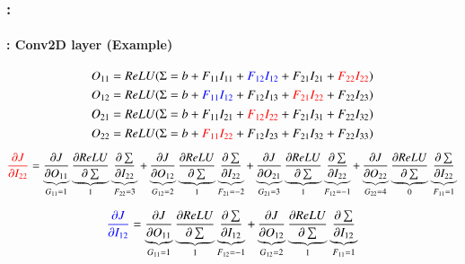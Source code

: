 \documentclass[xcolor=table]{beamer}
\begin{document}
\begin{frame}
	\frametitle{\insertshortsubtitle: \insertsection}
	\framesubtitle{\insertsubsection: Conv2D layer (Example)}
	
	
	\begin{center}
		\vskip-6pt
	\end{center}\vskip-16pt

	{\scriptsize 
		\[O_{11} = ReLU(\Sigma = b + F_{11} I_{11} + \textcolor{blue}{F_{12} I_{12}} + F_{21} I_{21} + \textcolor{red}{F_{22} I_{22}})  \]
		\[O_{12} = ReLU(\Sigma = b + \textcolor{blue}{F_{11} I_{12}} + F_{12} I_{13} + \textcolor{red}{F_{21} I_{22}} + F_{22} I_{23})  \]
		\[O_{21} = ReLU(\Sigma = b + F_{11} I_{21} + \textcolor{red}{F_{12} I_{22}} + F_{21} I_{31} + F_{22} I_{32})  \]
		\[O_{22} = ReLU(\Sigma = b + \textcolor{red}{F_{11} I_{22}} + F_{12} I_{23} + F_{21} I_{32} + F_{22} I_{33})  \]
	    	
	    \[\textcolor{red}{\frac{\partial J}{\partial I_{22}}} 
		= \underbrace{\frac{\partial J}{\partial O_{11}}}_{G_{11} = 1} 
		\underbrace{\frac{\partial ReLU}{\partial \sum}}_{1} 
		\underbrace{\frac{\partial \sum}{\partial I_{22}}}_{F_{22} = 3}
		+ \underbrace{\frac{\partial J}{\partial O_{12}}}_{G_{12} = 2} 
		\underbrace{\frac{\partial ReLU}{\partial \sum}}_{1} 
		\underbrace{\frac{\partial \sum}{\partial I_{22}}}_{F_{21} = -2}
		+ \underbrace{\frac{\partial J}{\partial O_{21}}}_{G_{21} = 3} 
		\underbrace{\frac{\partial ReLU}{\partial \sum}}_{1} 
		\underbrace{\frac{\partial \sum}{\partial I_{22}}}_{F_{12} = -1}
		+ \underbrace{\frac{\partial J}{\partial O_{22}}}_{G_{22} = 4} 
		\underbrace{\frac{\partial ReLU}{\partial \sum}}_{0} 
		\underbrace{\frac{\partial \sum}{\partial I_{22}}}_{F_{11} = 1}\]
		
		\[\textcolor{blue}{\frac{\partial J}{\partial I_{12}}} 
		= \underbrace{\frac{\partial J}{\partial O_{11}}}_{G_{11} = 1} 
		\underbrace{\frac{\partial ReLU}{\partial \sum}}_{1} 
		\underbrace{\frac{\partial \sum}{\partial I_{12}}}_{F_{12} = -1}
		+ \underbrace{\frac{\partial J}{\partial O_{12}}}_{G_{12} = 2} 
		\underbrace{\frac{\partial ReLU}{\partial \sum}}_{1} 
		\underbrace{\frac{\partial \sum}{\partial I_{12}}}_{F_{11} = 1}\]
	}

\end{frame}
\end{document}
